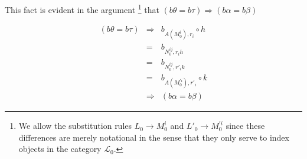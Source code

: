 \begin{frame}
This fact is evident in the argument \footnote{We allow the substitution rules $L_0 \rightarrow M_0^i$ and $L'_0 \rightarrow M_0^{'i}$ since these differences are merely notational in the sense that they only serve to index objects in the category $\mathcal{L}_0$.} that $(b \theta = b \tau) \Rightarrow (b \alpha = b \beta)$
\begin{block}{}
\abovedisplayskip=0pt
\begin{eqnarray*}
(b \theta = b \tau) &\Rightarrow & b_{A(M_0^i),r_i} \circ h \\
&=& b_{N_0^{ij},r_i h}\\
&=& b_{N_0^{ij},r'_i k}\\
&=& b_{A(M_0^{'i}),r'_i} \circ k\\
&\Rightarrow & (b \alpha = b \beta)
\end{eqnarray*}
\end{block}
\end{frame}